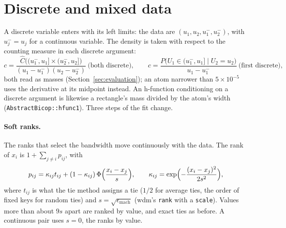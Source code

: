 \documentclass[11pt]{article}
\newcommand{\codeus}{\textunderscore\allowbreak}
\newcommand{\code}[1]{\begingroup\let\_\codeus\texttt{#1}\endgroup}
\begin{document}
\section{Discrete and mixed data}
\label{sec:discrete}

A discrete variable enters with its left limits: the data are
$(u_1, u_2, u_1^-, u_2^-)$, with $u_j^- = u_j$ for a continuous variable. The
density is taken with respect to the counting measure in each discrete
argument:
\[
  c = \frac{\hat C\bigl((u_1^-, u_1] \times (u_2^-, u_2]\bigr)}
           {(u_1 - u_1^-)(u_2 - u_2^-)} \ \text{(both discrete)}, \qquad
  c = \frac{P\bigl(U_1 \in (u_1^-, u_1] \mid U_2 = u_2\bigr)}{u_1 - u_1^-}
      \ \text{(first discrete)},
\]
both read as masses (Section~\ref{sec:evaluation}); an atom narrower than
$5 \times 10^{-5}$ uses the derivative at its midpoint instead. An h-function
conditioning on a discrete argument is likewise a rectangle's mass divided by
the atom's width (\code{AbstractBicop::hfunc1}). Three steps of the fit change.

\paragraph{Soft ranks.} The ranks that select the bandwidth move continuously
with the data. The rank of $x_i$ is $1 + \sum_{j \neq i} p_{ij}$, with
\[
  p_{ij} = \kappa_{ij} t_{ij} + (1 - \kappa_{ij})\,
           \Phi\Bigl(\frac{x_i - x_j}{s}\Bigr), \qquad
  \kappa_{ij} = \exp\Bigl(-\frac{(x_i - x_j)^2}{2 s^2}\Bigr),
\]
where $t_{ij}$ is what the tie method assigns a tie ($1/2$ for average ties,
the order of fixed keys for random ties) and $s = \sqrt{\epsilon_{\text{mach}}}$
(wdm's \code{rank} with a \code{scale}). Values more than about $9s$ apart are
ranked by value, and exact ties as before. A continuous pair uses $s = 0$,
the ranks by value.
\end{document}
